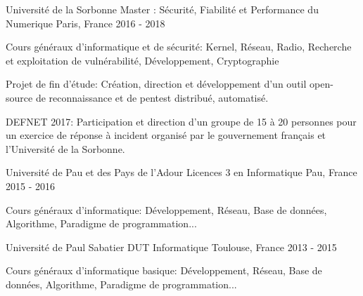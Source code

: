 

\begin{cventries}

  \cventry
    {Université de la Sorbonne} %
    {Master : Sécurité, Fiabilité et Performance du Numerique } %
    {Paris, France} %
    {2016 - 2018} %
    {
      \begin{cvitems} %
        \item {Cours généraux d'informatique et de sécurité: Kernel, Réseau, Radio, Recherche et exploitation de vulnérabilité, Développement, Cryptographie}
        \item {Projet de fin d'étude: Création, direction et développement d’un outil open-source de reconnaissance et de pentest distribué, automatisé.}
        \item {DEFNET 2017: Participation et direction d’un groupe de 15 à 20 personnes pour un exercice de réponse à incident organisé par le gouvernement français et l’Université de la Sorbonne.}
      \end{cvitems}
    }

  \cventry
    {Université de Pau et des Pays de l'Adour} %
    {Licences 3 en Informatique} %
    {Pau, France} %
    {2015 - 2016} %
    {
      \begin{cvitems}
        \item {Cours généraux d'informatique: Développement, Réseau, Base de données, Algorithme, Paradigme de programmation...}
      \end{cvitems}
    }

  \cventry
    {Université de Paul Sabatier} %
    {DUT Informatique} %
    {Toulouse, France} %
    {2013 - 2015} %
    {
      \begin{cvitems}
        \item {Cours généraux d'informatique basique: Développement, Réseau, Base de données, Algorithme, Paradigme de programmation...}
      \end{cvitems}
    }

\end{cventries}
